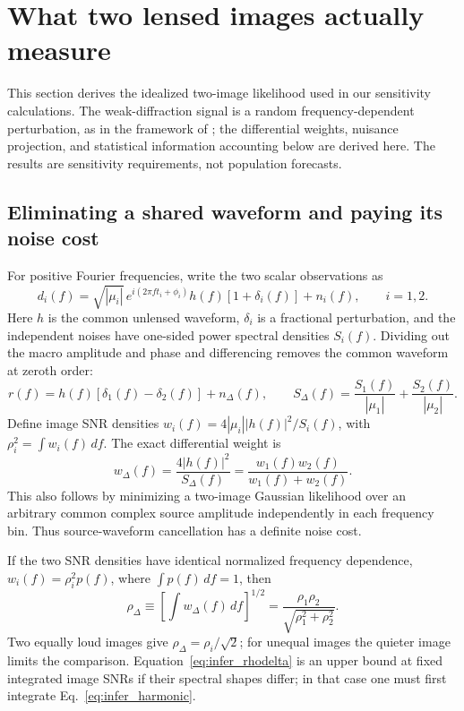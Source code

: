 \section{What two lensed images actually measure}
\label{sec:inference}

This section derives the idealized two-image likelihood used in our sensitivity
calculations. The weak-diffraction signal is a random frequency-dependent
perturbation, as in the framework of \cite{oguri2022,choi2026}; the differential
weights, nuisance projection, and statistical information accounting below are
derived here. The results are sensitivity requirements, not population forecasts.

\subsection{Eliminating a shared waveform and paying its noise cost}

For positive Fourier frequencies, write the two scalar observations as
\begin{equation}
 d_i(f)=\sqrt{|\mu_i|}\,e^{i(2\pi f t_i+\phi_i)}
 h(f)[1+\delta_i(f)]+n_i(f),\qquad i=1,2.
\end{equation}
Here \(h\) is the common unlensed waveform, \(\delta_i\) is a fractional
perturbation, and the independent noises have one-sided power spectral densities
\(S_i(f)\). Dividing out the macro amplitude and phase and differencing removes
the common waveform at zeroth order:
\begin{equation}
 r(f)=h(f)[\delta_1(f)-\delta_2(f)]+n_\Delta(f),\qquad
 S_\Delta(f)=\frac{S_1(f)}{|\mu_1|}+\frac{S_2(f)}{|\mu_2|}.
\end{equation}
Define image SNR densities \(w_i(f)=4|\mu_i||h(f)|^2/S_i(f)\), with
\(\rho_i^2=\int w_i(f)\,df\). The exact differential weight is
\begin{equation}
 \boxed{w_\Delta(f)=\frac{4|h(f)|^2}{S_\Delta(f)}
 =\frac{w_1(f)w_2(f)}{w_1(f)+w_2(f)}.}
 \label{eq:infer_harmonic}
\end{equation}
This also follows by minimizing a two-image Gaussian likelihood over an
arbitrary common complex source amplitude independently in each frequency bin.
Thus source-waveform cancellation has a definite noise cost.

If the two SNR densities have identical normalized frequency dependence,
\(w_i(f)=\rho_i^2p(f)\), where \(\int p(f)\,df=1\), then
\begin{equation}
 \rho_\Delta\equiv\left[\int w_\Delta(f)\,df\right]^{1/2}
 =\frac{\rho_1\rho_2}{\sqrt{\rho_1^2+\rho_2^2}}.
 \label{eq:infer_rhodelta}
\end{equation}
Two equally loud images give \(\rho_\Delta=\rho_i/\sqrt{2}\); for unequal
images the quieter image limits the comparison. Equation~\eqref{eq:infer_rhodelta}
is an upper bound at fixed integrated image SNRs if their spectral shapes differ;
in that case one must first integrate Eq.~\eqref{eq:infer_harmonic}.

